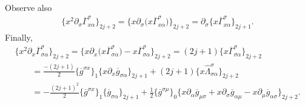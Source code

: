 \documentclass[11pt]{article}
\numberwithin{equation}{section}
\newcommand{\olGamma}{\overline{\Gamma}}
\newcommand{\gbar}{\overline{g}}
\begin{document}
Observe also
\begin{gather}\label{eqn:mixed-ref-4}
\big\{x^2 \partial_{\sigma} \olGamma_{x \alpha}^{\sigma}\big\}_{2j+2} = \big\{ x \partial_{\sigma} \big( x \olGamma_{x \alpha}^{\sigma} \big) \big\}_{2j+2}= \partial_{\sigma}\big\{ x \olGamma_{x \alpha}^{\sigma} \big\}_{2j+1}.
\end{gather}
Finally,
\begin{gather}
\big\{x^2 \partial_{x} \olGamma_{\sigma \alpha}^{\sigma}\big\}_{2j+2} = \big\{x \partial_{x} \big(x\olGamma_{\sigma \alpha}^{\sigma}\big) - x\olGamma_{\sigma \alpha}^{\sigma} \big\}_{2j+2}
 = (2j+1)\big\{x\olGamma_{\sigma \alpha}^{\sigma} \big\}_{2j+2}\nonumber \\
\qquad{} = \frac{-(2j+1)}{2} \{ \gbar^{\sigma x} \}_1 \{x \partial_x \gbar_{\sigma \alpha} \}_{2j+1} + (2j+1)\big\{ x \hat{\Lambda}_{\sigma \alpha}^{\sigma}\big\}_{2j+2} \nonumber\\
\qquad{} = -\frac{(2j+1)^2}{2} \{ \gbar^{\sigma x} \}_1 \{\gbar_{\sigma \alpha} \}_{2j+1} + \frac{1}{2}
\{\gbar^{\sigma \mu}\}_0 \{ x\partial_{\alpha} \gbar_{\mu \sigma}+ x\partial_{\sigma} \gbar_{\alpha \mu} - x\partial_{\mu} \gbar_{\alpha \sigma}\}_{2j+2}.\label{eqn:mixed-ref-5}
\end{gather}
\end{document}
